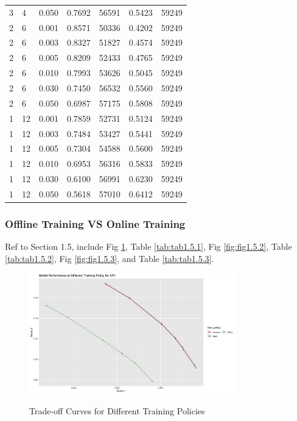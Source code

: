 \documentclass{article}
\begin{document}
\begin{longtable}[htbp]{l|l|l|*{4}{c}}
    3 & 4 & 0.050 & 0.7692 & 56591 & 0.5423 & 59249\\
    2 & 6 & 0.001 & 0.8571 & 50336 & 0.4202 & 59249\\
    2 & 6 & 0.003 & 0.8327 & 51827 & 0.4574 & 59249\\
    2 & 6 & 0.005 & 0.8209 & 52433 & 0.4765 & 59249\\
    2 & 6 & 0.010 & 0.7993 & 53626 & 0.5045 & 59249\\
    2 & 6 & 0.030 & 0.7450 & 56532 & 0.5560 & 59249\\
    2 & 6 & 0.050 & 0.6987 & 57175 & 0.5808 & 59249\\
    1 & 12 & 0.001 & 0.7859 & 52731 & 0.5124 & 59249\\
    1 & 12 & 0.003 & 0.7484 & 53427 & 0.5441 & 59249\\
    1 & 12 & 0.005 & 0.7304 & 54588 & 0.5600 & 59249\\
    1 & 12 & 0.010 & 0.6953 & 56316 & 0.5833 & 59249\\
    1 & 12 & 0.030 & 0.6100 & 56991 & 0.6230 & 59249\\
    1 & 12 & 0.050 & 0.5618 & 57010 & 0.6412 & 59249\\
\end{longtable}

\subsubsection{Offline Training VS Online Training}
Ref to Section 1.5, include Fig \ref{fig:fig1.5.1}, Table \ref{tab:tab1.5.1},
Fig \ref{fig:fig1.5.2}, Table \ref{tab:tab1.5.2}, Fig \ref{fig:fig1.5.3}, and
Table \ref{tab:tab1.5.3}.

\begin{figure}
    \caption{Trade-off Curves for Different Training Policies}
    \centering
    \includegraphics[width = 0.8\textwidth]{images/ModelPerformanceatDifferentTrainingPolicyforAR1.png}
    \label{fig:fig1.5.1}
\end{figure}
\end{document}
